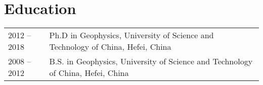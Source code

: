 \section*{Education}

\begin{tabular}{p{} p{}}
2012 -- 2018 & Ph.D in Geophysics, University of Science and Technology of China, Hefei, China \\
2008 -- 2012 & B.S. in Geophysics, University of Science and Technology of China, Hefei, China
\end{tabular}
